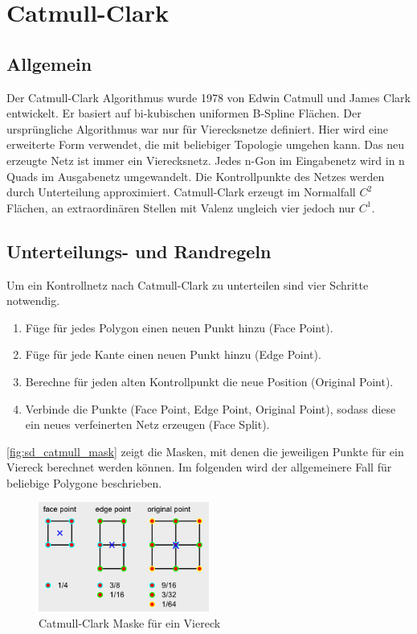 \section{Catmull-Clark} \label{sec:catmull}

\subsection{Allgemein}

Der Catmull-Clark Algorithmus wurde 1978 von Edwin Catmull und James Clark entwickelt.
Er basiert auf bi-kubischen uniformen B-Spline Flächen.
Der ursprüngliche Algorithmus war nur für Vierecksnetze definiert.
Hier wird eine erweiterte Form verwendet, die mit beliebiger Topologie umgehen kann.
Das neu erzeugte Netz ist immer ein Vierecksnetz.
Jedes n-Gon im Eingabenetz wird in n Quads
im Ausgabenetz umgewandelt.
Die Kontrollpunkte des Netzes werden durch Unterteilung approximiert.
Catmull-Clark erzeugt im Normalfall \(C^2\) Flächen,
an extraordinären Stellen mit Valenz ungleich vier jedoch
nur \(C^1\).
\cite[S. 75ff]{Zorin.subdivcourse} \cite[S. 52ff]{Standford.24.07.2015}


\subsection{Unterteilungs- und Randregeln}

Um ein Kontrollnetz nach Catmull-Clark zu unterteilen sind vier Schritte notwendig.
\begin{enumerate}
	\item Füge für jedes Polygon einen neuen Punkt hinzu (Face Point).
	\item Füge für jede Kante einen neuen Punkt hinzu (Edge Point).
	\item Berechne für jeden alten Kontrollpunkt die neue Position (Original Point).
	\item Verbinde die Punkte (Face Point, Edge Point, Original Point), sodass diese ein
	neues verfeinerten Netz erzeugen (Face Split).
\end{enumerate}

\autoref{fig:sd_catmull_mask} zeigt die Masken, mit denen die jeweiligen Punkte für ein Viereck berechnet werden können.
Im folgenden wird der allgemeinere Fall für beliebige Polygone beschrieben.
\begin{figure}
\centering
\includegraphics[width=0.5\textwidth]{content/media/sd_catmull_mask.png}
\caption{Catmull-Clark Maske für ein Viereck \cite{yoshihitoyagi.23.12.2015}}
\label{fig:sd_catmull_mask}
\end{figure}


